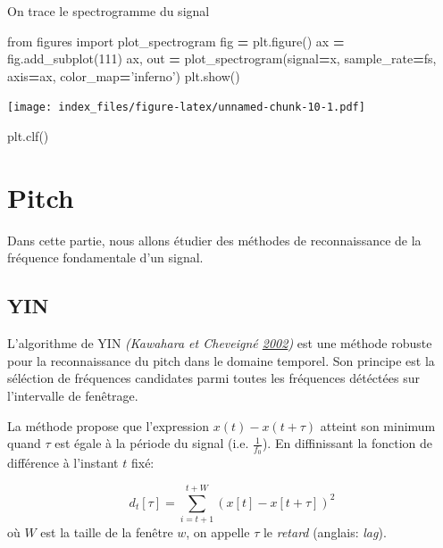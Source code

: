 \documentclass[french,]{article}
\newenvironment{Shaded}{\begin{snugshade}}{\end{snugshade}}
\newcommand{\DecValTok}[1]{\textcolor[rgb]{0.00,0.00,0.81}{#1}}
\newcommand{\ImportTok}[1]{#1}
\newcommand{\NormalTok}[1]{#1}
\newcommand{\OperatorTok}[1]{\textcolor[rgb]{0.81,0.36,0.00}{\textbf{#1}}}
\newcommand{\StringTok}[1]{\textcolor[rgb]{0.31,0.60,0.02}{#1}}
\begin{document}
\pagebreak

On trace le spectrogramme du signal

\begin{Shaded}
\begin{Highlighting}[]
\ImportTok{from}\NormalTok{ figures }\ImportTok{import}\NormalTok{ plot_spectrogram}
\NormalTok{fig }\OperatorTok{=}\NormalTok{ plt.figure()}
\NormalTok{ax }\OperatorTok{=}\NormalTok{ fig.add_subplot(}\DecValTok{111}\NormalTok{)}
\NormalTok{ax, out }\OperatorTok{=}\NormalTok{ plot_spectrogram(signal}\OperatorTok{=}\NormalTok{x, sample_rate}\OperatorTok{=}\NormalTok{fs, axis}\OperatorTok{=}\NormalTok{ax, color_map}\OperatorTok{=}\StringTok{'inferno'}\NormalTok{)}
\NormalTok{plt.show()}
\end{Highlighting}
\end{Shaded}

\texttt{[image: index\_files/figure-latex/unnamed-chunk-10-1.pdf]}

\begin{Shaded}
\begin{Highlighting}[]
\NormalTok{plt.clf()}
\end{Highlighting}
\end{Shaded}

\hypertarget{pitch}{%
\section{Pitch}\label{pitch}}

Dans cette partie, nous allons étudier des méthodes de reconnaissance de
la fréquence fondamentale d'un signal.

\hypertarget{yin}{%
\subsection{YIN}\label{yin}}

L'algorithme de YIN \emph{(Kawahara et Cheveigné
\protect\hyperlink{ref-yin}{2002})} est une méthode robuste pour la
reconnaissance du pitch dans le domaine temporel. Son principe est la
séléction de fréquences candidates parmi toutes les fréquences détéctées
sur l'intervalle de fenêtrage.

La méthode propose que l'expression \(x(t)-x(t+\tau)\) atteint son
minimum quand \(\tau\) est égale à la période du signal (i.e.
\(\frac{1}{f_0}\)). En diffinissant la fonction de différence à
l'instant \(t\) fixé:

\[ d_t[\tau] = \sum\limits_{i=t+1}^{t+W} \left(x[t]-x[t+\tau]\right)^2 \]
où \(W\) est la taille de la fenêtre \(w\), on appelle \(\tau\) le
\emph{retard} (anglais: \emph{lag}).
\end{document}
